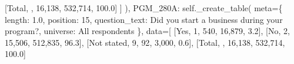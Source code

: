 \documentclass[
  11pt,
  a4paper,
]{article}
\newenvironment{Shaded}{\begin{snugshade}}{\end{snugshade}}
\newcommand{\NormalTok}[1]{\textcolor[rgb]{0.00,0.23,0.31}{#1}}
\newcommand{\OperatorTok}[1]{\textcolor[rgb]{0.37,0.37,0.37}{#1}}
\newcommand{\StringTok}[1]{\textcolor[rgb]{0.13,0.47,0.30}{#1}}
\newcommand{\VariableTok}[1]{\textcolor[rgb]{0.07,0.07,0.07}{#1}}
\begin{document}
\begin{Shaded}
\begin{Highlighting}[]
\NormalTok{                    [}\StringTok{\textquotesingle{}Total\textquotesingle{}}\NormalTok{, }\StringTok{\textquotesingle{}\textquotesingle{}}\NormalTok{, }\StringTok{\textquotesingle{}16,138\textquotesingle{}}\NormalTok{, }\StringTok{\textquotesingle{}532,714\textquotesingle{}}\NormalTok{, }\StringTok{\textquotesingle{}100.0\textquotesingle{}}\NormalTok{]}
\NormalTok{                ]}
\NormalTok{            ),}
            \StringTok{\textquotesingle{}PGM\_280A\textquotesingle{}}\NormalTok{: }\VariableTok{self}\NormalTok{.\_create\_table(}
\NormalTok{                meta}\OperatorTok{=}\NormalTok{\{}
                    \StringTok{\textquotesingle{}length\textquotesingle{}}\NormalTok{: }\StringTok{\textquotesingle{}1.0\textquotesingle{}}\NormalTok{, }\StringTok{\textquotesingle{}position\textquotesingle{}}\NormalTok{: }\StringTok{\textquotesingle{}15\textquotesingle{}}\NormalTok{,}
                    \StringTok{\textquotesingle{}question\_text\textquotesingle{}}\NormalTok{: }\StringTok{\textquotesingle{}Did you start a business during your program?\textquotesingle{}}\NormalTok{,}
                    \StringTok{\textquotesingle{}universe\textquotesingle{}}\NormalTok{: }\StringTok{\textquotesingle{}All respondents\textquotesingle{}}
\NormalTok{                \},}
\NormalTok{                data}\OperatorTok{=}\NormalTok{[}
\NormalTok{                    [}\StringTok{\textquotesingle{}Yes\textquotesingle{}}\NormalTok{, }\StringTok{\textquotesingle{}1\textquotesingle{}}\NormalTok{, }\StringTok{\textquotesingle{}540\textquotesingle{}}\NormalTok{, }\StringTok{\textquotesingle{}16,879\textquotesingle{}}\NormalTok{, }\StringTok{\textquotesingle{}3.2\textquotesingle{}}\NormalTok{],}
\NormalTok{                    [}\StringTok{\textquotesingle{}No\textquotesingle{}}\NormalTok{, }\StringTok{\textquotesingle{}2\textquotesingle{}}\NormalTok{, }\StringTok{\textquotesingle{}15,506\textquotesingle{}}\NormalTok{, }\StringTok{\textquotesingle{}512,835\textquotesingle{}}\NormalTok{, }\StringTok{\textquotesingle{}96.3\textquotesingle{}}\NormalTok{],}
\NormalTok{                    [}\StringTok{\textquotesingle{}Not stated\textquotesingle{}}\NormalTok{, }\StringTok{\textquotesingle{}9\textquotesingle{}}\NormalTok{, }\StringTok{\textquotesingle{}92\textquotesingle{}}\NormalTok{, }\StringTok{\textquotesingle{}3,000\textquotesingle{}}\NormalTok{, }\StringTok{\textquotesingle{}0.6\textquotesingle{}}\NormalTok{],}
\NormalTok{                    [}\StringTok{\textquotesingle{}Total\textquotesingle{}}\NormalTok{, }\StringTok{\textquotesingle{}\textquotesingle{}}\NormalTok{, }\StringTok{\textquotesingle{}16,138\textquotesingle{}}\NormalTok{, }\StringTok{\textquotesingle{}532,714\textquotesingle{}}\NormalTok{, }\StringTok{\textquotesingle{}100.0\textquotesingle{}}\NormalTok{]}

\end{Highlighting}
\end{Shaded}
\end{document}
